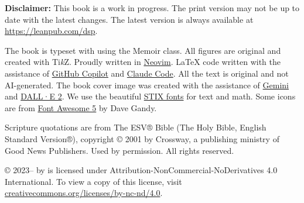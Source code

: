 \documentclass[print,gray]{dspbook}
\begin{document}
\vfill

{
  \footnotesize\noindent
  \textbf{Disclaimer:} This book is a work in progress.  The print version may not be up
  to date with the latest changes.  The latest version is always available at
  \url{https://leanpub.com/dsp}.
}

\vspace{0.5cm}
{
\footnotesize\noindent
The book is typeset with \XeTeX{} using the Memoir class.  All figures are
original and created with Ti\textit{k}Z.  Proudly written in
\href{https://neovim.io/}{Neovim}.  \LaTeX{} code written with the assistance of
\href{https://github.com/features/copilot}{GitHub Copilot} and
\href{https://www.anthropic.com/claude-code}{Claude Code}.
All the text is original and not AI-generated.
The book cover image was created with the assistance of
\href{https://gemini.google.com}{Gemini} and \href{https://openai.com/dall-e-2}{DALL·E 2}.
We use the beautiful \href{https://www.stixfonts.org/}{STIX fonts} for text and math.
Some icons are from \href{https://fontawesome.com/}{Font Awesome 5} by Dave Gandy.
}

\vspace{0.5cm}
{
\footnotesize\noindent
Scripture quotations are from The ESV® Bible (The Holy Bible, English Standard Version®),
copyright © 2001 by Crossway, a publishing ministry of Good News Publishers. Used by
permission. All rights reserved.
}

\vspace{0.5cm}
{
\footnotesize\noindent
\thetitle{} © 2023--\the\year{} by \theauthor{} is licensed under
Attribution-NonCommercial-NoDerivatives 4.0 International. To view a copy of this license,
visit
\href{http://creativecommons.org/licenses/by-nc-nd/4.0/}{creativecommons.org/licenses/by-nc-nd/4.0}.
}

\cleardoublepage



\cleardoublepage



\cleardoublepage

\tableofcontents

\cleardoublepage

\mainmatter










\startappendices




\printglossary

\printbibliography[heading=bibintoc]
\end{document}
